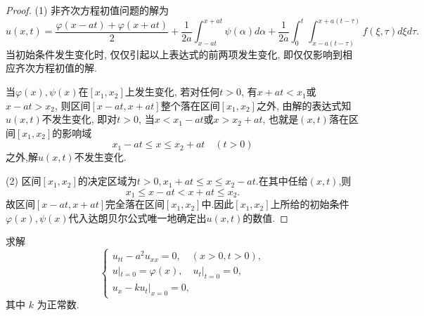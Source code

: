 \begin{proof}
	(1) 非齐次方程初值问题的解为
	$$u(x,t)=\frac{\varphi(x-at)+\varphi(x+at)}{2}+\frac{1}{2a}\int_{x-at}^{x+at}\psi(\alpha)d\alpha+\dfrac{1}{2a}\int_{0}^{t}\int_{x-a(t-\tau)}^{x+a(t-\tau)}f(\xi,\tau)d\xi d\tau.$$
	当初始条件发生变化时, 仅仅引起以上表达式的前两项发生变化, 即仅仅影响到相应齐次方程初值的解.
	
	当$\varphi(x),\psi(x)$在$[x_1,x_2]$上发生变化, 若对任何$t>0$, 有$x+at<x_1$或$x-at>x_2$, 则区间$[x-at,x+at]$整个落在区间$[x_1,x_2]$之外, 由解的表达式知$u(x,t)$不发生变化, 即对$t>0$, 当$x<x_1-at$或$x>x_2+at$, 也就是$(x,t)$落在区间$[x_1,x_2]$的影响域
	$$x_1-at\leq x\leq x_2+at\quad(t>0)$$
	之外,解$u(x,t)$不发生变化.
	
	(2) 区间$[x_1,x_2]$的决定区域为$t>0,x_1+at\leq x\leq x_2-at$.在其中任给$(x,t)$,则
	$$x_1\leq x-at<x+at\leq x_2.$$
	故区间$[x-at,x+at]$完全落在区间$[x_1,x_2]$中.因此$[x_1,x_2]$上所给的初始条件$\varphi(x),\psi(x)$代入达朗贝尔公式唯一地确定出$u(x,t)$的数值.
\end{proof}


\begin{exercise}[5]
  求解
  \[\begin{cases}
    u_{tt} - a^2 u_{xx} = 0,\quad (x>0, t>0), \\
    u|_{t=0} = \varphi(x),\quad u_t|_{t=0} = 0, \\
    u_x - ku_t|_{x=0} = 0,
  \end{cases}\]
  其中 $k$ 为正常数.
\end{exercise}

